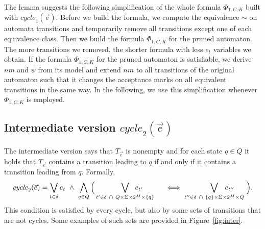 \documentclass[a4paper,UKenglish,cleveref,autoref,thm-restate]{lipics-v2021}
\newcommand{\rem}{\mathit{nm}}
\newcommand{\mcycle}{\mathit{cycle}}
\newcommand{\Te}{T_{\vec{e}}}
\begin{document}
The lemma suggests the following simplification of the whole formula
$\Phi_{1,C,K}$ built with $\mcycle_1(\vec{e})$. Before we build the
formula, we compute the equivalence $\sim$ on automata transitions and
temporarily remove all transitions except one of each equivalence class. Then we
build the formula $\Phi_{1,C,K}$ for the pruned automaton. The more
transitions we removed, the shorter formula with less $e_t$ variables
we obtain. If the formula $\Phi_{1,C,K}$ for the pruned automaton is
satisfiable, we derive $\rem$ and $\psi$ from its model and extend %
$\rem$ to all transitions of the original automaton such that
it changes the acceptance marks on all equivalent transitions in the
same way. In the following, we use this simplification whenever
$\Phi_{1,C,K}$ is employed.


\subsection{Intermediate version $\mcycle_2(\vec{e})$}
The intermediate version says that $\Te$ is nonempty and for each state
$q\in Q$ it holds that $\Te$ contains a transition leading to $q$ if
and only if it contains a transition leading from $q$.
Formally,
\[
  \mcycle_2(\vec{e})=\bigvee_{t\in\delta}e_t~\wedge~
  \bigwedge_{q\in Q}\Big(\bigvee_{t'\in\delta~\cap~Q\times\Sigma\times 2^M\times\{q\}}\hspace{-1cm}e_{t'}\hspace{1cm}\iff
  \bigvee_{t''\in\delta~\cap~\{q\}\times\Sigma\times 2^M\times Q}\hspace{-1cm}e_{t''}\hspace{6mm}\Big).
\]
This condition is satisfied by every cycle, but also by some sets of
transitions that are not cycles. Some examples of such sets are provided in Figure~\ref{fig:inter}.
\end{document}
